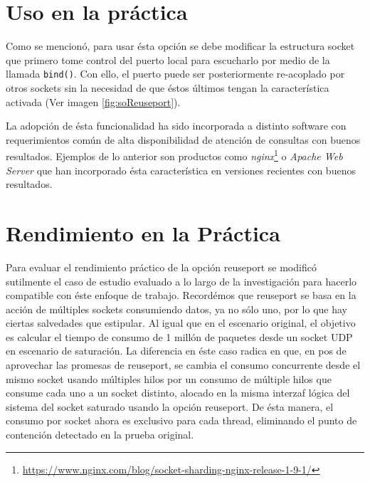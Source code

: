 \section{Uso en la práctica}
Como se mencionó, para usar ésta opción se debe modificar la estructura socket que primero tome control del puerto local para escucharlo por medio de la llamada \verb=bind()=. Con ello, el puerto puede ser posteriormente re-acoplado por otros sockets sin la necesidad de que éstos últimos tengan la característica activada (Ver imagen \ref{fig:soReuseport}).

La adopción de ésta funcionalidad ha sido incorporada a distinto software con requerimientos común de alta disponibilidad de atención de consultas con buenos resultados. Ejemplos de lo anterior son productos como \emph{nginx}\footnote{\url{https://www.nginx.com/blog/socket-sharding-nginx-release-1-9-1/}} o \emph{Apache Web Server} \cite{paper:apache} que han incorporado ésta característica en versiones recientes con buenos resultados.

\section{Rendimiento en la Práctica}
Para evaluar el rendimiento práctico de la opción reuseport se modificó sutilmente el caso de estudio evaluado a lo largo de la investigación para hacerlo compatible con éste enfoque de trabajo. Recordémos que reuseport se basa en la acción de múltiples sockets consumiendo datos, ya no sólo uno, por lo que hay ciertas salvedades que estipular. Al igual que en el escenario original, el objetivo es calcular el tiempo de consumo de 1 millón de paquetes desde un socket UDP en escenario de saturación. La diferencia en éste caso radica en que, en pos de aprovechar las promesas de reuseport, se cambia el consumo concurrente desde el mismo socket usando múltiples hilos por un consumo de múltiple hilos que consume cada uno a un socket distinto, alocado en la misma interzaf lógica del sistema del socket saturado usando la opción reuseport. De ésta manera, el consumo por socket ahora es exclusivo para cada thread, eliminando el punto de contención detectado en la prueba original.

